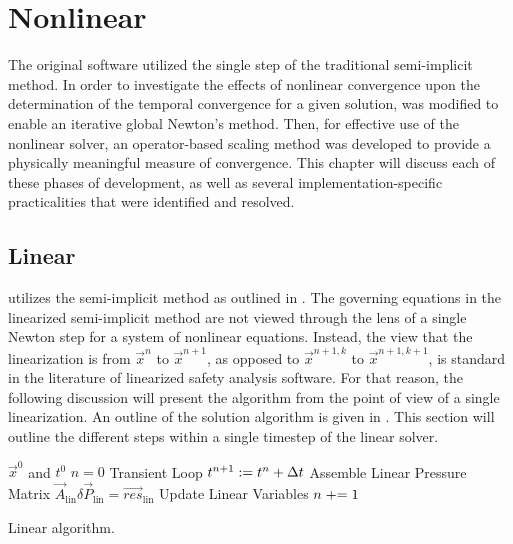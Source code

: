 \chapter{Nonlinear \cobra{}}
\label{chap:nonlinear}
The original \cobra{} software utilized the single step of the traditional semi-implicit method.
In order to investigate the effects of nonlinear convergence upon the determination of the temporal convergence for a given solution, \cobra{} was modified to enable an iterative global Newton's method.
Then, for effective use of the nonlinear solver, an operator-based scaling method was developed to provide a physically meaningful measure of convergence.
This chapter will discuss each of these phases of development, as well as several implementation-specific practicalities that were identified and resolved.

\section{Linear \cobra{}}
\label{sect:linCobraAlg}

\cobra{} utilizes the semi-implicit method as outlined in .
The governing equations in the linearized semi-implicit method are not viewed through the lens of a single Newton step for a system of nonlinear equations.
Instead, the view that the linearization is from $\vec{x}^{n}$ to $\vec{x}^{n+1}$, as opposed to $\vec{x}^{n+1, k}$ to $\vec{x}^{n+1, k+1}$, is standard in the literature of linearized safety analysis software.
For that reason, the following discussion will present the algorithm from the point of view of a single linearization.
An outline of the solution algorithm is given in .
This section will outline the different steps within a single timestep of the linear solver.

\begin{algo}[ht!]
\setlength{\baselineskip}{0.625\baselineskip}
\begin{algorithmic}[1]
\Require $\vec{x}^{0}$ and $t^{0}$
\Set $n = 0$
\Loop \; Transient Loop
    \Set $t^{n+1} : = t^{n} + \dt{}$
	\Algorithm Assemble Linear Pressure Matrix 
   	\Solve $\vec{A}_{\text{lin}} \delta \vec{P}_{\text{lin}} = \vec{res}_{\text{lin}}$
	\Algorithm Update Linear Variables 
	\Set $n \mathrel{+}= 1$
\EndLoop
\end{algorithmic}
\caption{Linear \cobra{} algorithm.}
\label{alg:linCobraAlgorithm}
\end{algo}

